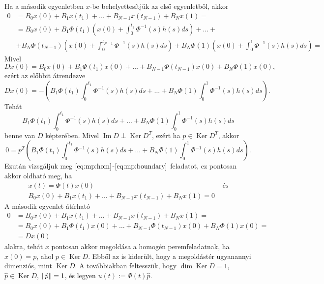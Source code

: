 \documentclass[oneside, titlepage, 12pt, a4paper]{report}
\DeclareMathOperator{\Ima}{Im}	%
\DeclareMathOperator{\Ker}{Ker}	%
\DeclarePairedDelimiter\norm{\lVert}{\rVert}	%
\begin{document}
Ha a második egyenletben $x$-be behelyettesítjük az első egyenletből, akkor
\begin{align*}
0 &= B_0 x(0) + B_1 x(t_1) + \dots + B_{N-1} x(t_{N-1}) + B_N x(1) = \\
 &= B_0 x(0) + B_1 \Phi(t_1) \left( x(0) + \int_0^{t_1} \Phi^{-1}(s) h(s) ds \right) + \dots + \\
 &+ B_N \Phi(t_{N-1}) \left( x(0) + \int_0^{t_{N-1}} \Phi^{-1}(s) h(s) ds \right) +  B_N \Phi(1) \left( x(0) + \int_0^1 \Phi^{-1}(s) h(s) ds \right) = 
\end{align*}
Mivel
\begin{equation*}
D x(0) = B_0 x(0) + B_1 \Phi(t_1) x(0) + \dots + B_{N-1} \Phi(t_{N-1}) x(0) + B_N \Phi(1) x(0),
\end{equation*}
ezért az előbbit átrendezve
\begin{equation*}
D x(0) = - \left( B_1 \Phi(t_1) \int_0^{t_1} \Phi^{-1}(s) h(s) ds + \dots + B_N \Phi(1) \int_0^1 \Phi^{-1}(s) h(s) ds \right).
\end{equation*}
Tehát
\begin{equation*}
B_1 \Phi(t_1) \int_0^{t_1} \Phi^{-1}(s) h(s) ds + \dots + B_N \Phi(1) \int_0^1 \Phi^{-1}(s) h(s) ds
\end{equation*}
benne van $D$ képterében. Mivel $\Ima D \perp \Ker D^T$, ezért ha $p \in \Ker D^T$, akkor
\begin{equation*}
0 = p^T \left( B_1 \Phi(t_1) \int_0^{t_1} \Phi^{-1}(s) h(s) ds + \dots + B_N \Phi(1) \int_0^1 \Phi^{-1}(s) h(s) ds \right).
\end{equation*}
Ezután vizsgáljuk meg $\eqref{eq:mp:hom}$-$\eqref{eq:mp:boundary}$ feladatot, ez pontosan akkor oldható meg, ha
\begin{align*}
&x(t) = \Phi(t) x(0) &\text{ és}& \\
&B_0 x(0) + B_1 x(t_1) + \dots + B_{N-1} x(t_{N-1}) + B_N x(1) = 0&&
\end{align*}
A második egyenlet átírható
\begin{align*}
0 &= B_0 x(0) + B_1 x(t_1) + \dots + B_{N-1} x(t_{N-1}) + B_N x(1) = \\
 &= B_0 x(0) + B_1 \Phi(t_1) x(0) + \dots + B_{N-1} \Phi(t_{N-1}) x(0) + B_N \Phi(1) x(0) = \\
 &= D x(0)
\end{align*}
alakra, tehát $x$ pontosan akkor megoldása a homogén peremfeladatnak, ha $x(0) = p$, ahol $p \in \Ker D$. Ebből az is kiderült, hogy a megoldástér ugyanannyi dimenziós, mint $\Ker D$. A továbbiakban feltesszük, hogy $\dim \Ker D = 1$, $\hat{p} \in \Ker D$, $\norm{\hat{p}} = 1$, és legyen $u(t) := \Phi(t) \hat{p}$. \\
\end{document}
